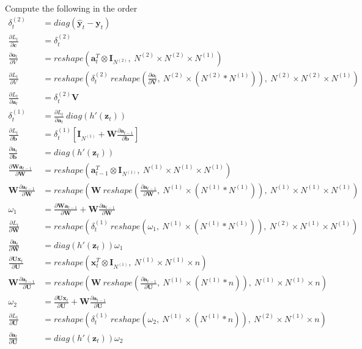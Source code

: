 \documentclass{article}
\newcommand{\diag}[1]{diag({#1})}
\newcommand{\reshape}[2]{reshape \left({#1},\ {#2}\right)}
\newcommand{\bm}[1]{\textbf{#1}}
\newcommand{\der}[2]{\frac{\partial #1}{\partial #2}}
\begin{document}
\begin{algorithm}
    \renewcommand{\thealgorithm}{}
    \begin{algorithmic}
        \State Compute the following in the order
        \begin{align*}
            \delta_t^{(2)} &= \diag{\hat{\bm{y}}_t - \bm{y}_t} \\
            \der{L_t}{\bm{c}} &= \delta_t^{(2)} \\
            \der{\bm{o}_t}{V} &= \reshape{\bm{a}_t^T\otimes \bm{I}_{N^{(2)}}}{N^{(2)}\times N^{(2)}\times N^{(1)}} \\
            \der{L_t}{V} &= \reshape{\delta_t^{(2)} \ \reshape{\der{\bm{o}_t}{\bm{V}}}{N^{(2)}\times\left(N^{(2)}*N^{(1)}\right)}}{N^{(2)}\times N^{(2)}\times N^{(1)}}\\
            \der{L_t}{\bm{a}_t} &= \delta_t^{(2)} \bm{V} \\
            \delta_t^{(1)} &= \der{L_t}{\bm{a}_t} \ \diag{h'(\bm{z}_t)} \\
            \der{L_t}{\bm{b}} &= \delta_t^{(1)} \left[\bm{I}_{N^{(1)}} + \bm{W} \der{\bm{a}_{t-1}}{\bm{b}}\right]\\
            \der{\bm{a}_t}{\bm{b}} &= \diag{h'(\bm{z}_t)} \\
            \der{\bm{W}\bm{a}_{t-1}}{\bm{W}} &= \reshape{\bm{a}_{t-1}^T \otimes \bm{I}_{N^{(1)}}}{N^{(1)}\times N^{(1)} \times N^{(1)}} \\
            \bm{W}\der{\bm{a}_{t-1}}{\bm{W}} &= \reshape{\bm{W} \ \reshape{\der{\bm{a}_{t-1}}{\bm{W}}}{N^{(1)}\times \left(N^{(1)}*N^{(1)}\right)}}{N^{(1)}\times N^{(1)}\times N^{(1)}} \\
            \omega_1 &= \der{\bm{W}\bm{a}_{t-1}}{\bm{W}}+\bm{W}\der{\bm{a}_{t-1}}{\bm{W}} \\
            \der{L_t}{\bm{W}} &= \reshape{\delta_t^{(1)} \ \reshape{\omega_1}{N^{(1)}\times \left(N^{(1)}*N^{(1)}\right)}}{N^{(2)}\times N^{(1)}\times N^{(1)}}\\
            \der{\bm{a}_t}{\bm{W}} &= \diag{h'\left(\bm{z}_t\right)} \omega_1 \\
            \der{\bm{U}\bm{x}_{t}}{\bm{U}} &= \reshape{\bm{x}_{t}^T \otimes \bm{I}_{N^{(1)}}}{N^{(1)}\times N^{(1)}\times n}\\
            \bm{W}\der{\bm{a}_{t-1}}{\bm{U}} &= \reshape{\bm{W} \ \reshape{\der{\bm{a}_{t-1}}{\bm{U}}}{N^{(1)}\times \left(N^{(1)}*n\right)}}{N^{(1)}\times N^{(1)}\times n} \\
            \omega_2 &= \der{\bm{U}\bm{x}_{t}}{\bm{U}}+\bm{W}\der{\bm{a}_{t-1}}{\bm{U}} \\
            \der{L_t}{\bm{U}} &= \reshape{\delta_t^{(1)} \ \reshape{\omega_2}{N^{(1)}\times \left(N^{(1)}*n\right)}}{N^{(2)}\times N^{(1)}\times n}\\
            \der{\bm{a}_{t}}{\bm{U}} &= \diag{h'(\bm{z}_t)} \omega_2
        \end{align*}
        \EndFor
        \EndFunction
    \end{algorithmic}
\end{algorithm}
\end{document}
